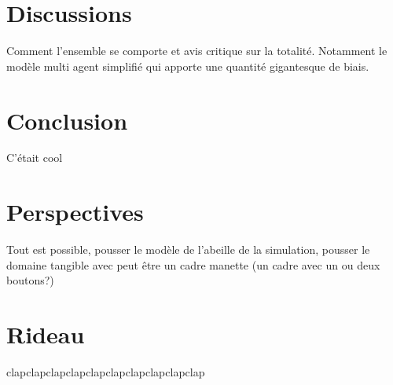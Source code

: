 \documentclass[10pt,a4paper]{article}
\begin{document}
\section{Discussions}
	Comment l'ensemble se comporte et avis critique sur la totalité. Notamment le modèle multi agent simplifié qui apporte une quantité gigantesque de biais.
\section*{Conclusion}
	C'était cool
\section*{Perspectives}
	Tout est possible, pousser le modèle de l'abeille de la simulation, pousser le domaine tangible avec peut être un cadre manette (un cadre avec un ou deux boutons?)
\section*{Rideau}
	clapclapclapclapclapclapclapclapclapclap
\end{document}
